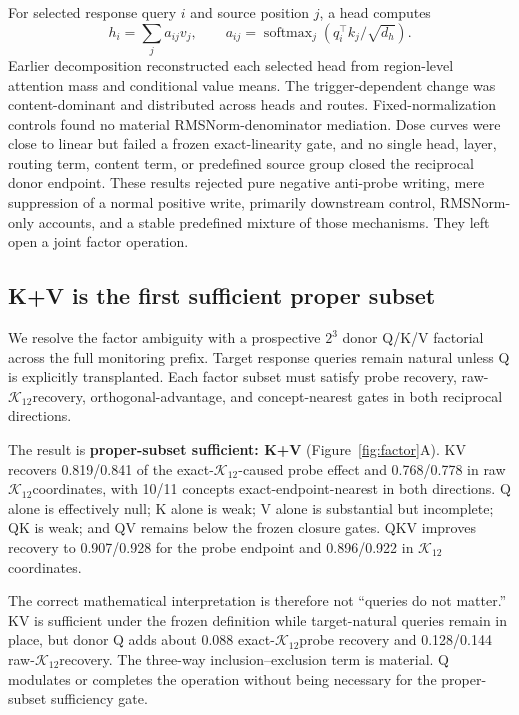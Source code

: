 \documentclass[10pt,twocolumn]{article}
\newcommand{\K}{\ensuremath{\mathcal{K}_{12}}}
\newcommand{\result}[1]{\textbf{#1}}
\begin{document}
For selected response query $i$ and source position $j$, a head computes
\begin{equation}
  h_i = \sum_j a_{ij}v_j, \qquad
  a_{ij}=\operatorname{softmax}_j(q_i^\top k_j/\sqrt{d_h}).
  \label{eq:attention}
\end{equation}
Earlier decomposition reconstructed each selected head from region-level attention mass and conditional value means. The trigger-dependent change was content-dominant and distributed across heads and routes. Fixed-normalization controls found no material RMSNorm-denominator mediation. Dose curves were close to linear but failed a frozen exact-linearity gate, and no single head, layer, routing term, content term, or predefined source group closed the reciprocal donor endpoint. These results rejected pure negative anti-probe writing, mere suppression of a normal positive write, primarily downstream control, RMSNorm-only accounts, and a stable predefined mixture of those mechanisms. They left open a joint factor operation.

\subsection{K+V is the first sufficient proper subset}

We resolve the factor ambiguity with a prospective $2^3$ donor Q/K/V factorial across the full monitoring prefix. Target response queries remain natural unless Q is explicitly transplanted. Each factor subset must satisfy probe recovery, raw-\K recovery, orthogonal-advantage, and concept-nearest gates in both reciprocal directions.

The result is \result{proper-subset sufficient: K+V} (Figure~\ref{fig:factor}A). KV recovers 0.819/0.841 of the exact-\K-caused probe effect and 0.768/0.778 in raw \K coordinates, with 10/11 concepts exact-endpoint-nearest in both directions. Q alone is effectively null; K alone is weak; V alone is substantial but incomplete; QK is weak; and QV remains below the frozen closure gates. QKV improves recovery to 0.907/0.928 for the probe endpoint and 0.896/0.922 in \K coordinates.

The correct mathematical interpretation is therefore not ``queries do not matter.'' KV is sufficient under the frozen definition while target-natural queries remain in place, but donor Q adds about 0.088 exact-\K probe recovery and 0.128/0.144 raw-\K recovery. The three-way inclusion--exclusion term is material. Q modulates or completes the operation without being necessary for the proper-subset sufficiency gate.
\end{document}
